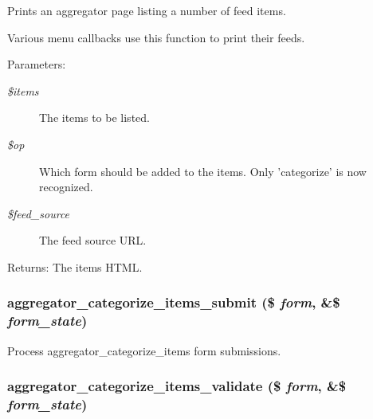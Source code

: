 Prints an aggregator page listing a number of feed items.

Various menu callbacks use this function to print their feeds.

\begin{Desc}
\item[Parameters:]
\begin{description}
\item[{\em \$items}]The items to be listed. \item[{\em \$op}]Which form should be added to the items. Only 'categorize' is now recognized. \item[{\em \$feed\_\-source}]The feed source URL. \end{description}
\end{Desc}
\begin{Desc}
\item[Returns:]The items HTML. \end{Desc}
\hypertarget{aggregator_8pages_8inc_04d005d45c0430ec3b97884ef4470d4f}{
\subsubsection[{aggregator\_\-categorize\_\-items\_\-submit}]{\setlength{\rightskip}{0pt plus 5cm}aggregator\_\-categorize\_\-items\_\-submit (\$ {\em form}, \/  \&\$ {\em form\_\-state})}}
\label{aggregator_8pages_8inc_04d005d45c0430ec3b97884ef4470d4f}


Process aggregator\_\-categorize\_\-items form submissions. \hypertarget{aggregator_8pages_8inc_e71e8db5c9acc1c94e1d3f30245525d0}{
\subsubsection[{aggregator\_\-categorize\_\-items\_\-validate}]{\setlength{\rightskip}{0pt plus 5cm}aggregator\_\-categorize\_\-items\_\-validate (\$ {\em form}, \/  \&\$ {\em form\_\-state})}}
\label{aggregator_8pages_8inc_e71e8db5c9acc1c94e1d3f30245525d0}


